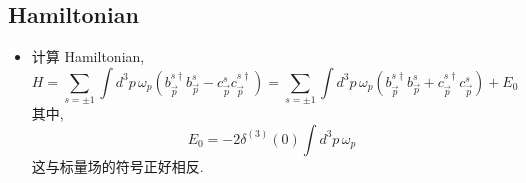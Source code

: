 \subsection{Hamiltonian}
\begin{itemize}
	\item 计算 Hamiltonian,
	\begin{equation}
		H = \sum_{s = \pm 1} \int d^3 p \, \omega_p (b^{s \dag}_{\vec{p}} b^s_{\vec{p}} - c^s_{\vec{p}} c^{s \dag}_{\vec{p}}) = \sum_{s = \pm 1} \int d^3 p \, \omega_p (b^{s \dag}_{\vec{p}} b^s_{\vec{p}} + c^{s \dag}_{\vec{p}} c^s_{\vec{p}}) + E_0
	\end{equation}
	其中,
	\begin{equation}
		E_0 = - 2 \delta^{(3)}(0) \int d^3 p \, \omega_p
	\end{equation}
	这与标量场的符号正好相反.
	

\end{itemize}
